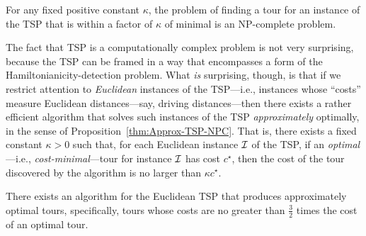 \begin{prop}
\label{thm:Approx-TSP-NPC}
For any fixed positive constant $\kappa$, the problem of finding a
tour for an instance of the TSP that is within a factor of $\kappa$ of
minimal is an {\sf NP}-complete problem.
\end{prop}


The fact that TSP is a computationally complex problem is not very
surprising, because the TSP can be framed in a way that encompasses a
form of the Hamiltonianicity-detection problem.
What {\em is} surprising, though, is that if we restrict attention to
{\em Euclidean} instances of the TSP---i.e., instances whose ``costs''
measure Euclidean  distances---say,
driving distances---then there exists a rather efficient algorithm
that solves such instances of the TSP {\em approximately} optimally,
in the sense of Proposition~\ref{thm:Approx-TSP-NPC}.  That is, there
exists a fixed constant $\kappa > 0$ such that, for each Euclidean
instance $\mbox{$\cal I$}$ of the TSP, if an {\em optimal}---i.e., {\em
  cost-minimal}---tour for instance $\mbox{$\cal I$}$ has cost $c^\star$, then the
cost of the tour discovered by the algorithm is no larger than $\kappa
c^\star$.


\begin{prop}{\cite{Christofides76}}
There exists an algorithm for the Euclidean TSP that produces
approximately optimal tours, specifically, tours whose costs are no
greater than $\displaystyle \frac{3}{2}$ times the cost of an optimal
tour.
\end{prop}

